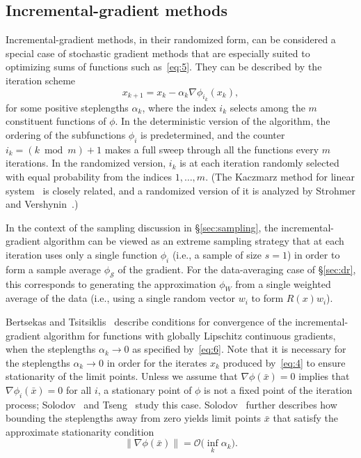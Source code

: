 \documentclass[nospthms]{svjour3}
\numberwithin{equation}{section}
\def\norm#1{\|#1\|}
\def\W{_{\scriptscriptstyle W}}
\def\k{_k}
\def\kp#1{_{k+#1}}
\def\xbar{\bar{x}}
\def\Oscr{\mathcal{O}}
\def\Sscr{\mathcal{S}}
\def\sample{\Sscr}
\def\phis{\phi_{\scriptscriptstyle\sample}}
\begin{document}
\subsection{Incremental-gradient methods}
\label{sec:incremental-grad}



Incremental-gradient methods, in their randomized form, can be
considered a special case of stochastic gradient methods that are
especially suited to optimizing sums of functions such
as~\eqref{eq:5}. They can be described by the iteration scheme
\begin{equation}
  \label{eq:4}
  x\kp1 = x\k - \alpha\k\nabla\phi_{i_k}(x\k),
\end{equation}
for some positive steplengths $\alpha\k$, where the index $i_k$
selects among the $m$ constituent functions of $\phi$. In the
deterministic version of the algorithm, the ordering of the
subfunctions $\phi_i$ is predetermined, and the counter $i_k = (k\bmod
m)+1$ makes a full sweep through all the functions every $m$
iterations. In the randomized version, $i_k$ is at each iteration
randomly selected with equal probability from the indices
$1,\ldots,m$.  (The Kaczmarz method for linear
system~\cite{kaczmarz1937aav} is closely related, and a randomized
version of it is analyzed by Strohmer and
Vershynin~\cite{strohmer2009randomized}.)

In the context of the sampling discussion in \S\ref{sec:sampling}, the
incremental-gradient algorithm can be viewed as an extreme sampling
strategy that at each iteration uses only a single function $\phi_i$
(i.e., a sample of size $s=1$) in order to form a sample average
$\phis$ of the gradient. For the data-averaging case of
\S\ref{sec:dr}, this corresponds to generating the approximation
$\phi\W$ from a single weighted average of the data (i.e., using a
single random vector $w_i$ to form $R(x)w_i$).

Bertsekas and Tsitsiklis~\cite[Prop.~3.8]{bertsekas1996neuro} describe
conditions for convergence of the incremental-gradient algorithm for
functions with globally Lipschitz continuous gradients, when the
steplengths $\alpha\k\to0$ as specified by~\eqref{eq:6}. Note that it
is necessary for the steplengths $\alpha\k\to0$ in order for the
iterates $x\k$ produced by~\eqref{eq:4} to ensure stationarity of the
limit points. Unless we assume that $\nabla\phi(\xbar)=0$ implies that
$\nabla\phi_i(\xbar)=0$ for all $i$, a stationary point of $\phi$ is not a
fixed point of the iteration process;
Solodov~\cite{solodov1998incremental} and Tseng~\cite{tseng:1998}
study this case.  Solodov~\cite{solodov1998incremental} further
describes how bounding the steplengths away from zero yields limit
points $\xbar$ that satisfy the approximate stationarity condition
\[
\norm{\nabla\phi(\xbar)}=\Oscr\big(\inf_k\alpha\k\big).
\]
\end{document}

